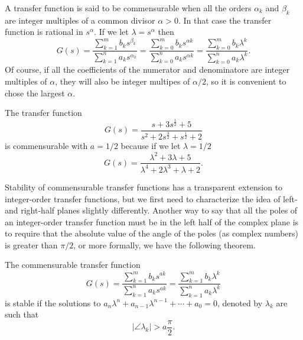 \begin{definition}
  A transfer function is said to be commensurable when all the orders $\alpha_k$ and $\beta_k$ are integer multiples of a common divisor $\alpha > 0$. In that case the transfer function is rational in $s^\alpha$. If we let $\lambda = s^\alpha$ then
  \begin{equation*}
    G(s) = \frac{\sum_{k=1}^m b_k s^{\beta_k}}{\sum_{k=1}^n a_k s^{\alpha_k}} = \frac{\sum_{k=0}^m b_k s^{\alpha k}}{\sum_{k=0}^n a_k s^{\alpha k}} = 
    \frac{\sum_{k=0}^m b_k \lambda^{k}}{\sum_{k=0}^n a_k \lambda^{k}}.
  \end{equation*}
  Of course, if all the coefficients of the numerator and denominatore are integer multiples of $\alpha$, they will also be integer multipes of $\alpha/2$, so it is convenient to chose the largest $\alpha$. 
  \label{def:commensurable}
\end{definition}

\begin{example}
  The transfer function
  \begin{equation*}
    G(s) = \frac{s + 3 s^\frac{1}{2} + 5}{s^2 + 2 s^\frac{3}{2} + s^\frac{1}{2} + 2}
  \end{equation*}
  is commensurable with $a = 1/2$ because if we let $\lambda = 1/2$
  \begin{equation*}
    G(s) = \frac{\lambda^2 + 3 \lambda + 5}{\lambda^4 + 2 \lambda^3 + \lambda + 2}.
  \end{equation*}
\end{example}

Stability of commensurable transfer functions has a transparent extension to integer-order transfer functions, but we first need to characterize the idea of left- and right-half planes slightly differently. Another way to say that all the poles of an integer-order transfer function must be in the left half of the complex plane is to require that the absolute value of the angle of the poles (as complex numbers) is greater than $\pi/2$, or more formally, we have the following theorem.

\begin{theorem}
  The commensurable transfer function
  \begin{equation*}
    G(s) =  \frac{\sum_{k=1}^m b_k s^{a k}}{\sum_{k=1}^n a_k s^{a k}} = 
    \frac{\sum_{k=1}^m b_k \lambda^{k}}{\sum_{k=1}^n a_k \lambda^{k}}
  \end{equation*}
  is stable if the solutions to $a_n \lambda^n + a_{n-1} \lambda^{n-1} + \cdots + a_0 = 0$, denoted by $\lambda_k$ are such that
  \begin{equation*}
    \left| \angle \lambda_k \right| > a \frac{\pi}{2}.
  \end{equation*}
  \label{th:commensurablestability}
\end{theorem}

